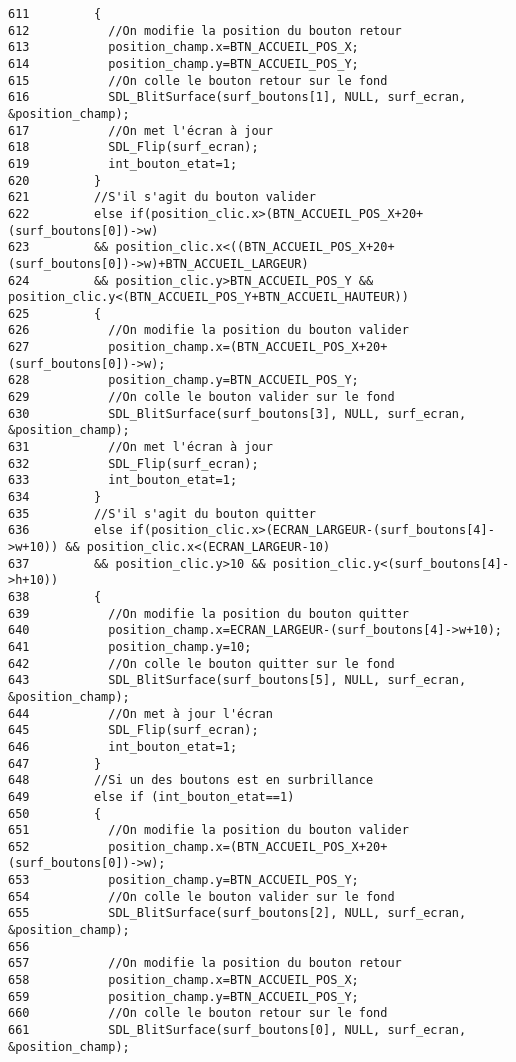 \begin{Code}
\begin{verbatim}
611         {
612           //On modifie la position du bouton retour
613           position_champ.x=BTN_ACCUEIL_POS_X;
614           position_champ.y=BTN_ACCUEIL_POS_Y;
615           //On colle le bouton retour sur le fond
616           SDL_BlitSurface(surf_boutons[1], NULL, surf_ecran, &position_champ);
617           //On met l'écran à jour
618           SDL_Flip(surf_ecran);
619           int_bouton_etat=1;
620         }
621         //S'il s'agit du bouton valider
622         else if(position_clic.x>(BTN_ACCUEIL_POS_X+20+(surf_boutons[0])->w)
623         && position_clic.x<((BTN_ACCUEIL_POS_X+20+(surf_boutons[0])->w)+BTN_ACCUEIL_LARGEUR)
624         && position_clic.y>BTN_ACCUEIL_POS_Y && position_clic.y<(BTN_ACCUEIL_POS_Y+BTN_ACCUEIL_HAUTEUR))
625         {
626           //On modifie la position du bouton valider
627           position_champ.x=(BTN_ACCUEIL_POS_X+20+(surf_boutons[0])->w);
628           position_champ.y=BTN_ACCUEIL_POS_Y;
629           //On colle le bouton valider sur le fond
630           SDL_BlitSurface(surf_boutons[3], NULL, surf_ecran, &position_champ);
631           //On met l'écran à jour
632           SDL_Flip(surf_ecran);
633           int_bouton_etat=1;
634         }
635         //S'il s'agit du bouton quitter
636         else if(position_clic.x>(ECRAN_LARGEUR-(surf_boutons[4]->w+10)) && position_clic.x<(ECRAN_LARGEUR-10)
637         && position_clic.y>10 && position_clic.y<(surf_boutons[4]->h+10))
638         {
639           //On modifie la position du bouton quitter
640           position_champ.x=ECRAN_LARGEUR-(surf_boutons[4]->w+10);
641           position_champ.y=10;
642           //On colle le bouton quitter sur le fond
643           SDL_BlitSurface(surf_boutons[5], NULL, surf_ecran, &position_champ);
644           //On met à jour l'écran
645           SDL_Flip(surf_ecran);
646           int_bouton_etat=1;
647         }
648         //Si un des boutons est en surbrillance
649         else if (int_bouton_etat==1)
650         {
651           //On modifie la position du bouton valider
652           position_champ.x=(BTN_ACCUEIL_POS_X+20+(surf_boutons[0])->w);
653           position_champ.y=BTN_ACCUEIL_POS_Y;
654           //On colle le bouton valider sur le fond
655           SDL_BlitSurface(surf_boutons[2], NULL, surf_ecran, &position_champ);
656 
657           //On modifie la position du bouton retour
658           position_champ.x=BTN_ACCUEIL_POS_X;
659           position_champ.y=BTN_ACCUEIL_POS_Y;
660           //On colle le bouton retour sur le fond
661           SDL_BlitSurface(surf_boutons[0], NULL, surf_ecran, &position_champ);

\end{verbatim}
\end{Code}
